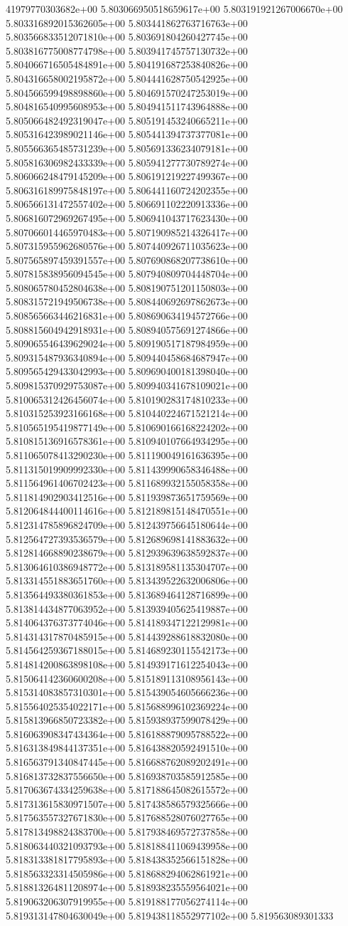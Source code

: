 41979770303682e+00	5.803066950518659617e+00	5.803191921267006670e+00	5.803316892015362605e+00	5.803441862763716763e+00	5.803566833512071810e+00	5.803691804260427745e+00	5.803816775008774798e+00	5.803941745757130732e+00	5.804066716505484891e+00	5.804191687253840826e+00	5.804316658002195872e+00	5.804441628750542925e+00	5.804566599498898860e+00	5.804691570247253019e+00	5.804816540995608953e+00	5.804941511743964888e+00	5.805066482492319047e+00	5.805191453240665211e+00	5.805316423989021146e+00	5.805441394737377081e+00	5.805566365485731239e+00	5.805691336234079181e+00	5.805816306982433339e+00	5.805941277730789274e+00	5.806066248479145209e+00	5.806191219227499367e+00	5.806316189975848197e+00	5.806441160724202355e+00	5.806566131472557402e+00	5.806691102220913336e+00	5.806816072969267495e+00	5.806941043717623430e+00	5.807066014465970483e+00	5.807190985214326417e+00	5.807315955962680576e+00	5.807440926711035623e+00	5.807565897459391557e+00	5.807690868207738610e+00	5.807815838956094545e+00	5.807940809704448704e+00	5.808065780452804638e+00	5.808190751201150803e+00	5.808315721949506738e+00	5.808440692697862673e+00	5.808565663446216831e+00	5.808690634194572766e+00	5.808815604942918931e+00	5.808940575691274866e+00	5.809065546439629024e+00	5.809190517187984959e+00	5.809315487936340894e+00	5.809440458684687947e+00	5.809565429433042993e+00	5.809690400181398040e+00	5.809815370929753087e+00	5.809940341678109021e+00	5.810065312426456074e+00	5.810190283174810233e+00	5.810315253923166168e+00	5.810440224671521214e+00	5.810565195419877149e+00	5.810690166168224202e+00	5.810815136916578361e+00	5.810940107664934295e+00	5.811065078413290230e+00	5.811190049161636395e+00	5.811315019909992330e+00	5.811439990658346488e+00	5.811564961406702423e+00	5.811689932155058358e+00	5.811814902903412516e+00	5.811939873651759569e+00	5.812064844400114616e+00	5.812189815148470551e+00	5.812314785896824709e+00	5.812439756645180644e+00	5.812564727393536579e+00	5.812689698141883632e+00	5.812814668890238679e+00	5.812939639638592837e+00	5.813064610386948772e+00	5.813189581135304707e+00	5.813314551883651760e+00	5.813439522632006806e+00	5.813564493380361853e+00	5.813689464128716899e+00	5.813814434877063952e+00	5.813939405625419887e+00	5.814064376373774046e+00	5.814189347122129981e+00	5.814314317870485915e+00	5.814439288618832080e+00	5.814564259367188015e+00	5.814689230115542173e+00	5.814814200863898108e+00	5.814939171612254043e+00	5.815064142360600208e+00	5.815189113108956143e+00	5.815314083857310301e+00	5.815439054605666236e+00	5.815564025354022171e+00	5.815688996102369224e+00	5.815813966850723382e+00	5.815938937599078429e+00	5.816063908347434364e+00	5.816188879095788522e+00	5.816313849844137351e+00	5.816438820592491510e+00	5.816563791340847445e+00	5.816688762089202491e+00	5.816813732837556650e+00	5.816938703585912585e+00	5.817063674334259638e+00	5.817188645082615572e+00	5.817313615830971507e+00	5.817438586579325666e+00	5.817563557327671830e+00	5.817688528076027765e+00	5.817813498824383700e+00	5.817938469572737858e+00	5.818063440321093793e+00	5.818188411069439958e+00	5.818313381817795893e+00	5.818438352566151828e+00	5.818563323314505986e+00	5.818688294062861921e+00	5.818813264811208974e+00	5.818938235559564021e+00	5.819063206307919955e+00	5.819188177056274114e+00	5.819313147804630049e+00	5.819438118552977102e+00	5.819563089301333